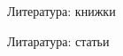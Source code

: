 \begin{frame}{Литература: книжки}
\printbibliography[type=book]
\end{frame}

\begin{frame}{Литаратура: статьи}
\printbibliography[type=article]
\end{frame}
